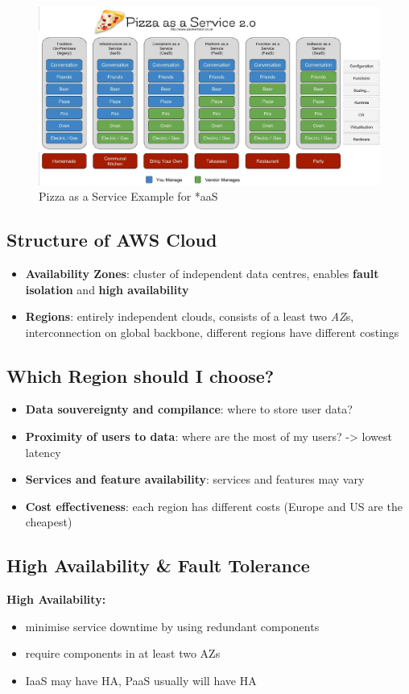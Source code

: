 \documentclass[a4paper]{article}
\begin{document}
\begin{multicols}{3}
\begin{figure}[H]
    \includegraphics[width=\linewidth]{pizzaserviceexample.png}
    \caption{Pizza as a Service Example for *aaS}
    \label{fig:pizzaservice}
\end{figure}

\subsection{Structure of AWS Cloud}
\begin{itemize}
    \item \textbf{Availability Zones}: cluster of independent data centres, enables \textbf{fault isolation} and \textbf{high availability}
    \item \textbf{Regions}: entirely independent clouds, consists of a least two \textit{AZ}s, interconnection on global backbone, different regions have different costings
\end{itemize}

\subsection{Which Region should I choose?}
\begin{itemize}
    \item \textbf{Data souvereignty and compilance}: where to store user data?
    \item \textbf{Proximity of users to data}: where are the most of my users? -> lowest latency
    \item \textbf{Services and feature availability}: services and features may vary
    \item \textbf{Cost effectiveness}: each region has different costs (Europe and US are the cheapest)
\end{itemize}

\subsection{High Availability \& Fault Tolerance}
\textbf{High Availability:}
\begin{itemize}
    \item minimise service downtime by using redundant components
    \item require components in at least two AZs
    \item IaaS may have HA, PaaS usually will have HA
\end{itemize}


\end{multicols}
\end{document}
